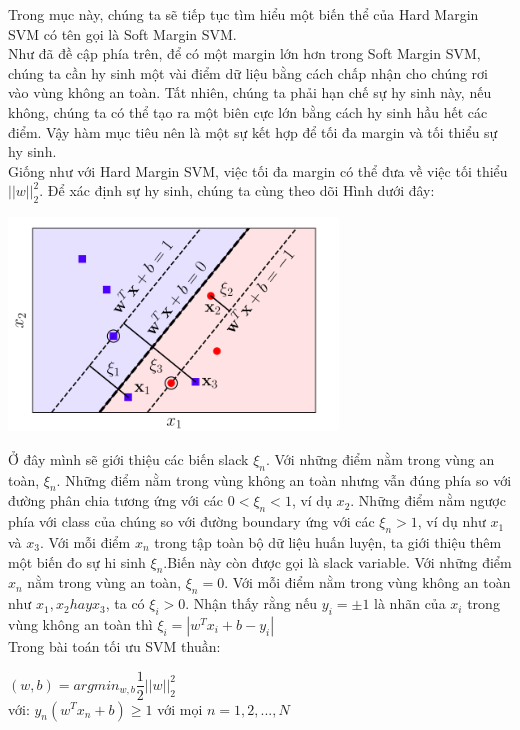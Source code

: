 \documentclass[12pt,a4paper]{article}
\begin{document}
\indent Trong mục này, chúng ta sẽ tiếp tục tìm hiểu một biến thể của Hard Margin SVM có tên gọi là Soft Margin SVM.\\
\indent Như đã đề cập phía trên, để có một margin lớn hơn trong Soft Margin SVM, chúng ta cần hy sinh một vài điểm dữ liệu bằng cách chấp nhận cho chúng rơi vào vùng không an toàn. Tất nhiên, chúng ta phải hạn chế sự hy sinh này, nếu không, chúng ta có thể tạo ra một biên cực lớn bằng cách hy sinh hầu hết các điểm. Vậy hàm mục tiêu nên là một sự kết hợp để tối đa margin và tối thiểu sự hy sinh.\\
\indent Giống như với Hard Margin SVM, việc tối đa margin có thể đưa về việc tối thiểu $||w||_2^2$. Để xác định sự hy sinh, chúng ta cùng theo dõi Hình dưới đây:\\
\begin{center}
    \includegraphics[scale=1.0]{img/img6.png}
\end{center}
\indent Ở đây mình sẽ giới thiệu các biến slack $\xi_n$. Với những điểm nằm trong vùng an toàn, $\xi_n$. Những điểm nằm trong vùng không an toàn nhưng vẫn đúng phía so với đường phân chia tương ứng với các $0 < \xi_n < 1$, ví dụ $x_2$. Những điểm nằm ngược phía với class của chúng so với đường boundary ứng với các $\xi_n >1$, ví dụ như $x_1$ và $x_3$.
Với mỗi điểm $x_n$ trong tập toàn bộ dữ liệu huấn luyện, ta giới thiệu thêm một biến đo sự hi sinh $\xi_n$.Biến này còn được gọi là slack variable. Với những điểm $x_n$ nằm trong vùng an toàn, $\xi_n = 0$. Với mỗi điểm nằm trong vùng không an toàn như $x_1, x_2 hay x_3$, ta có $\xi_i > 0$. Nhận thấy rằng nếu $y_i = \pm{1}$ là nhãn của $x_i$ trong vùng không an toàn thì $\xi_i = |w^Tx_i + b - y_i|$\\
Trong bài toán tối ưu SVM thuần: \\
\begin{center}
$(w,b) = argmin_{w,b}\dfrac{1}{2}||w||_2^2$\\
với: $y_n(w^Tx_n +b) \geq 1$ với mọi $n=1,2,...,N$
\end{center}
\end{document}
